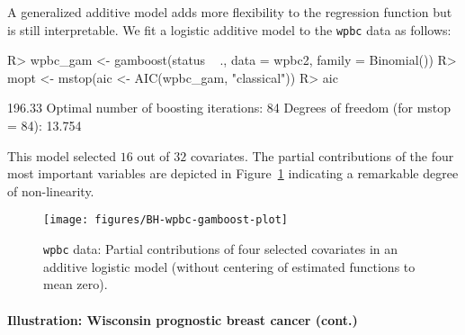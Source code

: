 \documentclass{article}
\newcommand{\Robject}[1]{\texttt{#1}}
\newenvironment{Schunk}{}{}
\begin{document}

A generalized additive model adds more flexibility to the regression function but is still
interpretable. We fit a logistic additive model to the \Robject{wpbc} data as follows:
\begin{Schunk}
\begin{Sinput}
R> wpbc_gam <- gamboost(status ~ ., data = wpbc2, 
         family = Binomial())
R> mopt <- mstop(aic <- AIC(wpbc_gam, "classical"))
R> aic
\end{Sinput}
\begin{Soutput}
[1] 196.33
Optimal number of boosting iterations: 84 
Degrees of freedom (for mstop = 84): 13.754 
\end{Soutput}
\end{Schunk}
This model selected $16$ out of $32$
covariates. The partial contributions of the four most important variables
are depicted in  
Figure~\ref{wpbc-gamboost-plot} indicating a remarkable degree of non-linearity.
\begin{figure}[t]
\begin{center}
\texttt{[image: figures/BH-wpbc-gamboost-plot]}
\caption{\Robject{wpbc} data: Partial contributions of four selected 
    covariates in an additive logistic model (without centering of
    estimated functions to mean zero).
    \label{wpbc-gamboost-plot}}
\end{center}
\end{figure}



\paragraph{Illustration: Wisconsin prognostic breast cancer (cont.)}         

\end{document}
